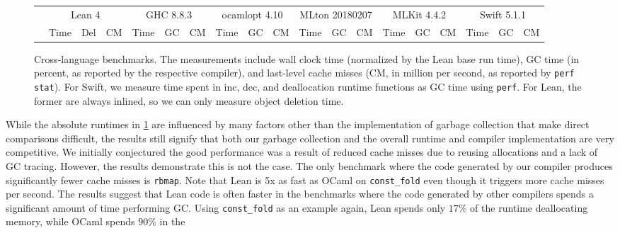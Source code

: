 \begin{figure}
  \centering
  \begin{tabular}{lrrrrrrrrrrrrrrrrrr} \toprule
    &\multicolumn{3}{c}{Lean 4} & \multicolumn{3}{c}{GHC 8.8.3} & \multicolumn{3}{c}{ocamlopt 4.10} & \multicolumn{3}{c}{MLton 20180207} & \multicolumn{3}{c}{MLKit 4.4.2} & \multicolumn{3}{c}{Swift 5.1.1} \\
    \cmidrule(lr{.5em}){2-4} \cmidrule(lr{.5em}){5-7} \cmidrule(lr{.5em}){8-10} \cmidrule(lr{.5em}){11-13} \cmidrule(lr{.5em}){14-16} \cmidrule(lr{.5em}){17-19}
    & Time & Del & CM & Time & GC & CM & Time & GC & CM & Time & GC & CM & Time & GC & CM & Time & GC & CM \\ \midrule
    
    \bottomrule
  \end{tabular}

  \caption{Cross-language benchmarks. The measurements include wall clock time
    (normalized by the Lean base run time), GC time (in percent, as reported
    by the respective compiler), and last-level cache misses (CM, in million per
    second, as reported by \texttt{perf stat}). For Swift, we measure time spent
    in inc, dec, and deallocation runtime functions as GC time using \texttt{perf}.
    For Lean, the former are always inlined, so we can only measure object deletion
    time.}
  \label{fig:crossbench}
\end{figure}
While the absolute runtimes in \cref{fig:crossbench}
are influenced by many factors other than the implementation
of garbage collection that make direct comparisons difficult,
the results still signify that both our garbage collection
and the overall runtime and compiler implementation are very
competitive.  We initially conjectured the good performance was a result of
reduced cache misses due to reusing allocations and a lack
of GC tracing.
However, the results demonstrate this is not the case.  The
only benchmark where the code generated by our compiler produces
significantly fewer cache misses is \verb!rbmap!.  Note that Lean is
5x as fast as OCaml on \verb!const_fold!  even though it
triggers more cache misses per second.  The results
suggest that Lean code is often faster in the benchmarks where
the code generated by other compilers spends a significant amount of time performing GC. Using
\verb!const_fold! as an example again, Lean spends only $17\%$
of the runtime deallocating memory, while OCaml spends $90\%$ in the
